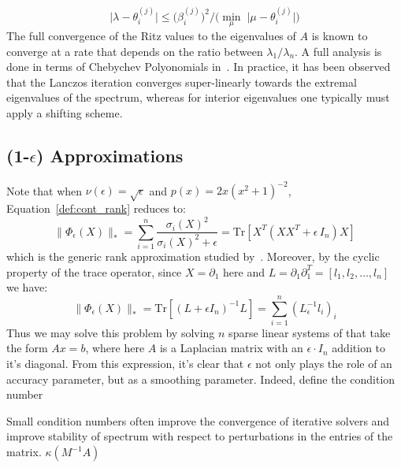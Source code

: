 \documentclass[10pt]{article}
\numberwithin{equation}{section}
\newcommand{\+}{%
	\raisebox{0.18ex}{\scaleobj{0.55}{+}}
}
\theoremstyle{definition}
\begin{document}
 \begin{equation}
 	\lvert \lambda - \theta_i^{(j)} \rvert \leq \big ( \beta_i^{(j)} \big )^2 / \big( \min_\mu \; \lvert \mu - \theta_i^{(j)} \rvert \big ) 
 \end{equation}
The full convergence of the Ritz values to the eigenvalues of $A$ is known to converge at a rate that depends on the ratio between $\lambda_1/\lambda_n$. A full analysis is done in terms of Chebychev Polyonomials in~\cite{golub2013matrix}. In practice, it has been observed that the Lanczos iteration converges super-linearly towards the extremal eigenvalues of the spectrum, whereas for interior eigenvalues one typically must apply a shifting scheme.

\subsection{(1-$\epsilon$) Approximations}
Note that when $\nu(\epsilon) = \sqrt{\epsilon}$ and $p(x) = 2x (x^2 + 1)^{-2}$, Equation~\eqref{def:cont_rank} reduces to: 
\begin{equation*}
	\lVert \Phi_\epsilon(X) \rVert_\ast = \sum\limits_{i = 1}^n \frac{\sigma_i(X)^2}{\sigma_i(X)^2 + \epsilon} = \mathrm{Tr}\left[X^T (X X^T + \epsilon \, I_n) X \right] 
\end{equation*}
which is the generic rank approximation studied by~\cite{}. Moreover, by the cyclic property of the trace operator, since $X = \partial_1$ here and $L = \partial_1 \partial_1^T = [l_1, l_2, \dots, l_n]$ we have: 
\begin{equation*}
	\lVert \Phi_\epsilon(X) \rVert_\ast = \mathrm{Tr}[(L + \epsilon I_n)^{-1} L] = \sum\limits_{i=1}^n (L_\epsilon^{-1} l_i)_i
\end{equation*}
Thus we may solve this problem by solving $n$ sparse linear systems of that take the form $Ax = b$, where here $A$ is a Laplacian matrix with an $\epsilon \cdot I_n$ addition to it's diagonal. 
From this expression, it's clear that $\epsilon$ not only plays the role of an accuracy parameter, but as a smoothing parameter. Indeed, define the condition number

Small condition numbers often improve the convergence of iterative solvers and improve stability of spectrum with respect to perturbations in the entries of the matrix. 
$\kappa(M^{-1} A)$
\end{document}

